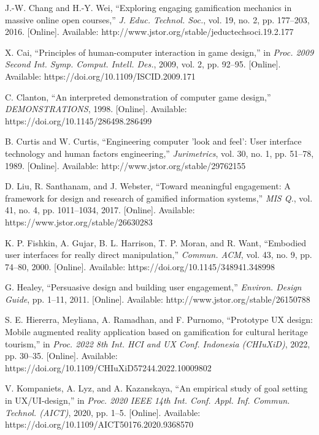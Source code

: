 \documentclass[conference]{IEEEtran}
\begin{document}
\begin{thebibliography}{00}

 J.-W. Chang and H.-Y. Wei, ``Exploring engaging gamification mechanics in massive online open courses,'' \textit{J. Educ. Technol. Soc.}, vol. 19, no. 2, pp. 177–203, 2016. [Online]. Available: http://www.jstor.org/stable/jeductechsoci.19.2.177

 X. Cai, ``Principles of human-computer interaction in game design,'' in \textit{Proc. 2009 Second Int. Symp. Comput. Intell. Des.}, 2009, vol. 2, pp. 92–95. [Online]. Available: https://doi.org/10.1109/ISCID.2009.171

 C. Clanton, ``An interpreted demonstration of computer game design,'' \textit{DEMONSTRATIONS}, 1998. [Online]. Available: https://doi.org/10.1145/286498.286499

 B. Curtis and W. Curtis, ``Engineering computer 'look and feel': User interface technology and human factors engineering,'' \textit{Jurimetrics}, vol. 30, no. 1, pp. 51–78, 1989. [Online]. Available: http://www.jstor.org/stable/29762155

 D. Liu, R. Santhanam, and J. Webster, ``Toward meaningful engagement: A framework for design and research of gamified information systems,'' \textit{MIS Q.}, vol. 41, no. 4, pp. 1011–1034, 2017. [Online]. Available: https://www.jstor.org/stable/26630283

 K. P. Fishkin, A. Gujar, B. L. Harrison, T. P. Moran, and R. Want, ``Embodied user interfaces for really direct manipulation,'' \textit{Commun. ACM}, vol. 43, no. 9, pp. 74–80, 2000. [Online]. Available: https://doi.org/10.1145/348941.348998

 G. Healey, ``Persuasive design and building user engagement,'' \textit{Environ. Design Guide}, pp. 1–11, 2011. [Online]. Available: http://www.jstor.org/stable/26150788

 S. E. Hiererra, Meyliana, A. Ramadhan, and F. Purnomo, ``Prototype UX design: Mobile augmented reality application based on gamification for cultural heritage tourism,'' in \textit{Proc. 2022 8th Int. HCI and UX Conf. Indonesia (CHIuXiD)}, 2022, pp. 30–35. [Online]. Available: https://doi.org/10.1109/CHIuXiD57244.2022.10009802

 V. Kompaniets, A. Lyz, and A. Kazanskaya, ``An empirical study of goal setting in UX/UI-design,'' in \textit{Proc. 2020 IEEE 14th Int. Conf. Appl. Inf. Commun. Technol. (AICT)}, 2020, pp. 1–5. [Online]. Available: https://doi.org/10.1109/AICT50176.2020.9368570


\end{thebibliography}
\end{document}
